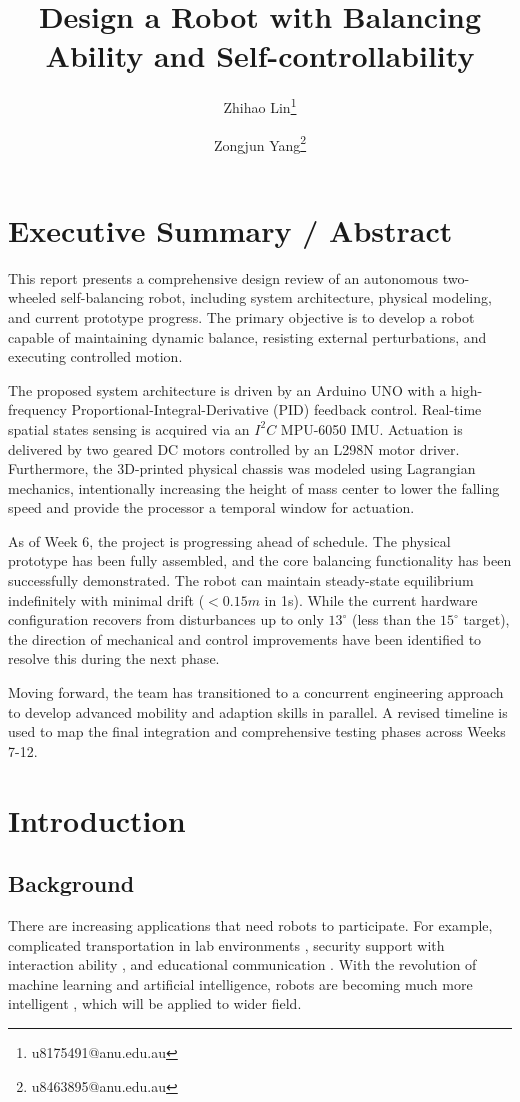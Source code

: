 \documentclass[9pt,a4paper,twocolumn]{tau-class/tau}
\title{Design a Robot with Balancing Ability and Self-controllability}
\author{Zhihao Lin\thanks{u8175491@anu.edu.au}}
\author{Zongjun Yang\thanks{u8463895@anu.edu.au}}
\affil[1]{Research School of Physics, Australian National University, Canberra ACT, 2601, Australia}
\begin{document}
\maketitle

\section{Executive Summary / Abstract}
This report presents a comprehensive design review of an autonomous two-wheeled self-balancing robot, including system architecture, physical modeling, and current prototype progress. The primary objective is to develop a robot capable of maintaining dynamic balance, resisting external perturbations, and executing controlled motion. 

The proposed system architecture is driven by an Arduino UNO with a high-frequency Proportional-Integral-Derivative (PID) feedback control. Real-time spatial states sensing is acquired via an $I^2C$ MPU-6050 IMU. Actuation is delivered by two geared DC motors controlled by an L298N motor driver. Furthermore, the 3D-printed physical chassis was modeled using Lagrangian mechanics, intentionally increasing the height of mass center to lower the falling speed and provide the processor a temporal window for actuation.

As of Week 6, the project is progressing ahead of schedule. The physical prototype has been fully assembled, and the core balancing functionality has been successfully demonstrated. The robot can maintain steady-state equilibrium indefinitely with minimal drift ($<0.15m$ in 1s). While the current hardware configuration recovers from disturbances up to only $13^\circ$ (less than the $15^\circ$ target), the direction of mechanical and control improvements have been identified to resolve this during the next phase.

Moving forward, the team has transitioned to a concurrent engineering approach to develop advanced mobility and adaption skills in parallel. A revised timeline is used to map the final integration and comprehensive testing phases across Weeks 7-12.

\section{Introduction}

\subsection{Background}
There are increasing applications that need robots to participate. For example, complicated transportation in lab environments \cite{application_lab_transportation_liu_2013}, security support with interaction ability \cite{application_security_lopez_2017}, and educational communication \cite{application_social_tony_2018}. With the revolution of machine learning and artificial intelligence, robots are becoming much more intelligent \cite{ai_soori_2023, mobile_robot_raj_2022}, which will be applied to wider field.
\end{document}
